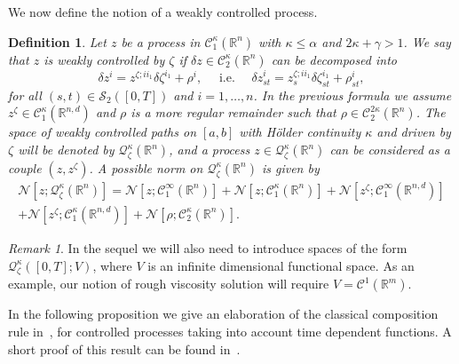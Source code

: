 \documentclass[12pt,reqno]{amsart}
\numberwithin{equation}{section}  %
\newcommand{\der}{\delta}
\newcommand{\1}{{\bf 1}}
\newcommand{\2}{{\bf 2}}
\newcommand{\R}{\mathbb R}
\newcommand{\cac}{\mathcal C}
\newcommand{\cn}{\mathcal N}
\newcommand{\cq}{\mathcal Q}
\newcommand{\al}{\alpha}
\newcommand{\ga}{\gamma}
\newcommand{\ka}{\kappa}
\newtheorem{definition}[theorem]{Definition}
\theoremstyle{remark}
\newtheorem{remark}[theorem]{Remark}
\theoremstyle{remark}
\begin{document}
\noindent
We now define the notion of a weakly controlled process.
\begin{definition}\label{def:weakly-ctrld}
	Let $z$ be a process in $\cac_{1}^{\ka}(\R^n)$ with $\ka \leq \al$ and $2\ka +\ga > 1$. We say that $z$ is weakly controlled by $\zeta$ if $\der z \in \cac_2^{\ka}(\R^n)$ can be decomposed into
	\begin{equation}\label{eq:weakly-controlled}
	\der z^{i} = z^{\zeta;i i_1} \der \zeta^{i_1} + \rho^{i}, 
	\quad\text{   i.e.  }\quad
{\der z}_{st}^{i} = z_{s}^{\zeta;i i_1}{\der \zeta}_{st}^{i_1} + \rho_{st}^{i} ,
	\end{equation}
	for all $(s,t) \in \mathcal{S}_2 \left([0,T]\right)$ and $i=1, \ldots,n$. In the previous formula we assume $z^{\zeta} \in \cac_{1}^{\ka}(\R^{n,d})$ and $\rho$ is a more regular remainder such that $\rho \in \cac_{2}^{2\ka}(\R^{n})$. The space of weakly controlled paths on $[a,b]$ with H\"older continuity $\ka$ and driven by $\zeta$ will be denoted by $\mathcal{Q}_{\zeta}^{\ka}(\R^n)$, and a process $z \in \mathcal{Q}_{\zeta}^{\ka}(\R^n)$ can be considered as a couple $(z, z^\zeta)$. A possible norm on $\mathcal{Q}_{\zeta}^{\ka}(\R^n)$ is given by
	\begin{multline}\label{eq:norm-controlled}
	\cn[z;\mathcal{Q}_{\zeta}^{\ka}(\R^n)] = 
	\cn[z; \cac_1^{\infty}(\R^n)]+\cn[z; \cac_1^{\ka}(\R^n)] + \cn[z^\zeta; \cac_1^{\infty}(\R^{n,d})] \\+ \cn[z^\zeta; \cac_1^{\ka}(\R^{n,d})] + \cn[\rho; \cac_2^{\ka}(\R^n)].
	\end{multline}
\end{definition}

\begin{remark}\label{rem:j-e}
In the sequel we will also need to introduce spaces of the form $\cq_{\zeta}^{\ka}({[0,T]}; V)$, where $V$ is an infinite dimensional functional space. As an example, our notion of rough viscosity solution will require $V = \cac^1(\R^m)$.
\end{remark}

In the following proposition we give an elaboration of the classical composition rule in~\cite{gubinelli}, for controlled processes taking into account time dependent functions. A short proof of this result can be found in~\cite{CHT}.
 
\end{document}
